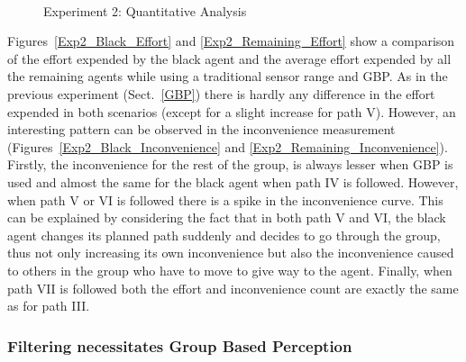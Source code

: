 \begin{figure}[!t]
  \centering
  \hspace{1pt}
  \\
  \hspace{1pt}
  \caption{Experiment 2: Quantitative Analysis}
  \label{Exp2_QuantitativeAnalysis}
\end{figure}

Figures~\ref{Exp2_Black_Effort} and \ref{Exp2_Remaining_Effort} show a comparison of the effort expended by the black agent and the average effort expended by all the remaining agents while using a traditional sensor range and GBP. As in the previous experiment (Sect.~\ref{GBP}) there is hardly any difference in the effort expended in both scenarios (except for a slight increase for path V). However, an interesting pattern can be observed in the inconvenience measurement (Figures~\ref{Exp2_Black_Inconvenience} and \ref{Exp2_Remaining_Inconvenience}). Firstly, the inconvenience for the rest of the group, is always lesser when GBP is used and almost the same for the black agent when path IV is followed. However, when path V or VI is followed there is a spike in the inconvenience curve. This can be explained by considering the fact that in both path V and VI, the black agent changes its planned path suddenly and decides to go through the group, thus not only increasing its own inconvenience but also the inconvenience caused to others in the group who have to move to give way to the agent. Finally, when path VII is followed both the effort and inconvenience count are exactly the same as for path III.

\subsubsection{Filtering necessitates Group Based Perception}


